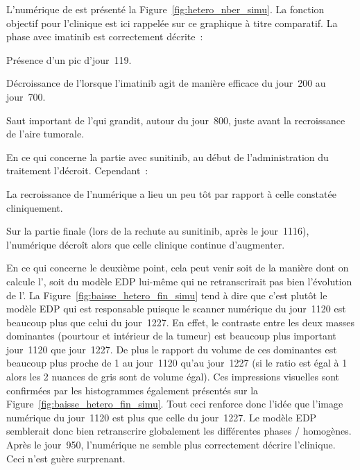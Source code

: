 \documentclass[main.tex]{subfiles}
\begin{document}
L'\hetero numérique de \Nber est présenté la Figure~\ref{fig:hetero_nber_simu}. 
La fonction objectif pour l'\hetero clinique %
est ici rappelée sur ce graphique à titre comparatif. La phase avec imatinib est  correctement décrite~:
\begin{myitemize}
\item Présence d'un pic d'\hetero jour~119.
\item Décroissance de l'\hetero lorsque l'imatinib agit de manière efficace du jour~200 au jour~700.
\item Saut important de l'\hetero qui grandit, autour du jour~800, juste avant la recroissance de l'aire tumorale.
\end{myitemize}
En ce qui concerne la partie avec sunitinib, au début de l'administration du traitement l'\hetero décroit. Cependant~:
\begin{myitemize}
\item La recroissance de l'\hetero numérique a lieu un peu tôt par rapport à celle constatée cliniquement.
\item Sur la partie finale (lors de la rechute au sunitinib, après le jour~1116), l'\hetero numérique décroît alors que celle clinique continue d'augmenter. 
\end{myitemize}
En ce qui concerne le deuxième point, cela peut venir soit de la manière dont on calcule l'\hetero, soit du modèle EDP lui-même qui ne retranscrirait pas bien l'évolution de l'\hetero. La Figure~\ref{fig:baisse_hetero_fin_simu} tend à dire que c'est plutôt le modèle EDP qui est responsable puisque le scanner numérique du jour~1120 est beaucoup 
plus \heterogene que celui du jour~1227. 
En effet, le contraste entre les deux masses dominantes (pourtour et intérieur de la tumeur) 
est beaucoup plus important jour~1120 que jour~1227. De plus le rapport du volume de ces dominantes est beaucoup plus proche de 1 au jour~1120 qu'au jour~1227 (si le ratio est égal à 1 alors les 2 nuances de gris sont de volume égal). Ces impressions visuelles sont confirmées par les histogrammes également présentés sur la Figure~\ref{fig:baisse_hetero_fin_simu}. 
Tout ceci renforce donc l'idée que l'image numérique du jour~1120 est plus \heterogene que celle du jour~1227. Le modèle EDP semblerait donc bien retranscrire globalement les différentes phases  \heterogenes / homogènes. Après le jour~950, l'\hetero numérique ne semble plus correctement  décrire l'\hetero clinique. Ceci n'est guère surprenant. %
\end{document}
